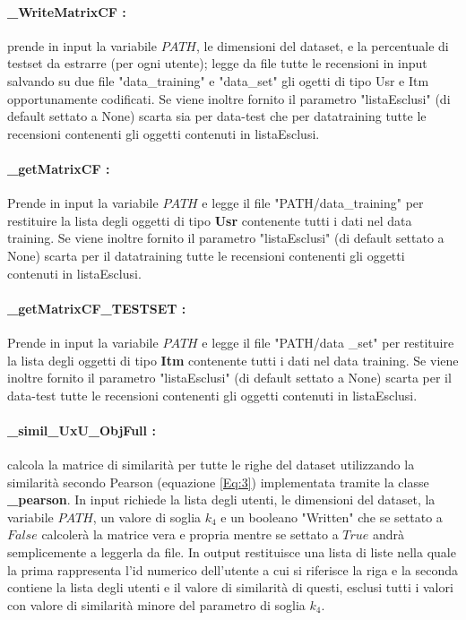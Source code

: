 \documentclass[12pt]{article}
\begin{document}
\paragraph{\_WriteMatrixCF :} prende in input la variabile $PATH$, le dimensioni del dataset, e la percentuale di testset da estrarre (per ogni utente); legge da file tutte le recensioni in input salvando su due file "data\_training" e "data\_set" gli ogetti di tipo Usr e Itm opportunamente codificati. Se viene inoltre fornito il parametro "listaEsclusi" (di default settato a None) scarta sia per data-test che per datatraining tutte le recensioni contenenti gli oggetti contenuti in listaEsclusi.
\paragraph{\_getMatrixCF :}  Prende in input la variabile $PATH$ e legge il file "PATH/data\_training" per restituire la lista degli oggetti di tipo \textbf{Usr} contenente tutti i dati nel data training. Se viene inoltre fornito il parametro "listaEsclusi" (di default settato a None) scarta per il datatraining tutte le recensioni contenenti gli oggetti contenuti in listaEsclusi.
\paragraph{\_getMatrixCF\_TESTSET :}  Prende in input la variabile $PATH$ e legge il file "PATH/data \_set" per restituire la lista degli oggetti di tipo \textbf{Itm} contenente tutti i dati nel data training. Se viene inoltre fornito il parametro "listaEsclusi" (di default settato a None) scarta per il data-test tutte le recensioni contenenti gli oggetti contenuti in listaEsclusi.

\paragraph{\_simil\_UxU\_ObjFull :} calcola la matrice di similarità per tutte le righe del dataset utilizzando la similarità secondo Pearson (equazione \ref{Eq:3}) implementata tramite la classe \textbf{\_pearson}. In input richiede la lista degli utenti, le dimensioni del dataset, la variabile $PATH$, un valore di soglia $k_4$ e un booleano "Written" che se settato a $False$ calcolerà la matrice vera e propria mentre se settato a $True$ andrà semplicemente a leggerla da file. In output restituisce una lista di liste nella quale la prima rappresenta l'id numerico dell'utente a cui si riferisce la riga e la seconda contiene la lista degli utenti e il valore di similarità di questi, esclusi tutti i valori con valore di similarità minore del parametro di soglia $k_4$.
\end{document}
